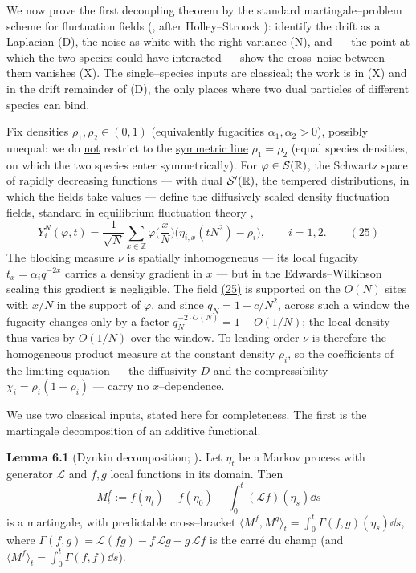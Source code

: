\documentclass[11pt]{article}
\theoremstyle{plain}
\theoremstyle{definition}
\theoremstyle{remark}
\newcommand{\Z}{\mathbb{Z}}\newcommand{\R}{\mathbb{R}}\newcommand{\N}{\mathbb{N}}
\newcommand{\cL}{\mathcal L}\newcommand{\cO}{\mathcal O}\newcommand{\cE}{\mathcal E}
\begin{document}
We now prove the first decoupling theorem by the standard martingale--problem scheme for
fluctuation fields (\cite[Ch.~11]{KL}, after Holley--Stroock \cite{HolleyStroock}):
identify the drift as a Laplacian (D), the noise as white with the
right variance (N), and --- the point at which the two species could have interacted ---
show the cross--noise between them vanishes (X). The single--species inputs are
classical; the work is in (X) and in the drift remainder of (D), the only places where
two dual particles of different species can bind.

Fix densities $\rho_1,\rho_2\in(0,1)$ (equivalently fugacities $\alpha_1,\alpha_2>0$),
possibly unequal: we do \underline{not} restrict to the \underline{symmetric line} $\rho_1=\rho_2$
(equal species densities, on which the two species enter symmetrically). For
$\varphi\in\cS(\R)$, the Schwartz space of rapidly decreasing functions --- with dual
$\cS'(\R)$, the tempered distributions, in which the fields take values --- define the
diffusively scaled density fluctuation fields, standard in equilibrium fluctuation
theory \cite[Ch.~11]{KL},
\label{eq_field}
\begin{equation}
  Y_i^N(\varphi,t)=\frac1{\sqrt N}\sum_{x\in\Z}\varphi\Big(\frac xN\Big)
   \big(\eta_{i,x}(tN^2)-\rho_i\big),\qquad i=1,2.\qquad(25)
\end{equation}
The blocking measure $\nu$ is spatially inhomogeneous --- its local fugacity
$t_x=\alpha_i q^{-2x}$ carries a density gradient in $x$ --- but in the
Edwards--Wilkinson scaling this gradient is negligible. The field \hyperref[eq_field]{(25)} is
supported on the $O(N)$ sites with $x/N$ in the support of $\varphi$, and since
$q_N=1-c/N^2$, across such a window the fugacity changes only by a factor
$q_N^{-2\cdot O(N)}=1+O(1/N)$; the local density thus varies by $O(1/N)$ over the
window. To leading order $\nu$ is therefore the homogeneous product measure at the
constant density $\rho_i$, so the coefficients of the limiting equation --- the
diffusivity $D$ and the compressibility $\chi_i=\rho_i(1-\rho_i)$ --- carry no
$x$--dependence.

We use two classical inputs, stated here for completeness. The first is the martingale
decomposition of an additive functional.

\label{lem_dynkin}\noindent\textbf{Lemma 6.1} (Dynkin decomposition; {\cite[App.~1.5]{KL}})\textbf{.} 
Let $\eta_t$ be a Markov process with generator $\cL$ and $f,g$ local functions in its
domain. Then
\[
  M^f_t:=f(\eta_t)-f(\eta_0)-\int_0^t(\cL f)(\eta_s)\dd s
\]
is a martingale, with predictable cross--bracket
$\langle M^f,M^g\rangle_t=\int_0^t\Gamma(f,g)(\eta_s)\dd s$, where
$\Gamma(f,g)=\cL(fg)-f\,\cL g-g\,\cL f$ is the carr\'e du champ (and
$\langle M^f\rangle_t=\int_0^t\Gamma(f,f)\dd s$).
\par
\end{document}
